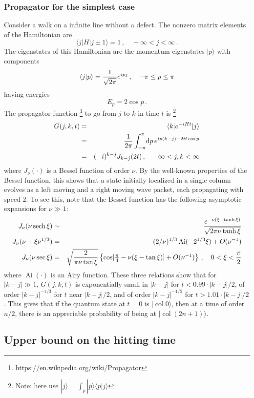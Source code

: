 \documentclass[aps,11pt,twoside,nofootinbib,tightenlines,superscriptaddress,preprintnumbers]{revtex4}
\newcommand{\<}{\langle}
\renewcommand{\>}{\rangle}
\newcommand{\be}{\begin{equation}}
\newcommand{\ee}{\end{equation}}
\newcommand{\bea}{\begin{eqnarray}}
\newcommand{\eea}{\end{eqnarray}}
\renewcommand{\d}{{\mathrm{d}}}
\newcommand{\sech}{\mathop{\mathrm{sech}}\nolimits}
\newcommand{\Ai}{\mathop{\mathrm{Ai}}\nolimits}
\newcommand{\col}{\mathop{\mathrm{col}}\nolimits}
\newenvironment{proof sketch}
{\trivlist\item\noindent{\bf Proof sketch}~}
{\qed\endtrivlist}
\begin{document}
\subsubsection{Propagator for the simplest case}

Consider a walk on a infinite line without a defect.
The nonzero matrix elements of the Hamiltonian are
\be
  \<j|H|j\pm 1\> = 1 \,,\quad -\infty < j < \infty
\,.
\ee
The eigenstates of this Hamiltonian are the momentum eigenstates $|p\>$ with components
\be
  \<j|p\> = {1 \over \sqrt{2\pi}} e^{i p j}
  \,, \quad -\pi \le p \le \pi
\ee
having energies
\be
  E_p = 2 \cos p 
\,.
\ee
The propagator function \footnote{https://en.wikipedia.org/wiki/Propagator} to go from $j$ to $k$ in time $t$ is \footnote{Note: here use $|j\> = \int_p |p\>\<p|j\>$}
\bea
\label{eq:green}
  G(j,k,t) &=& \<k|e^{-i H t}|j\> \\
           &=& {1 \over 2 \pi} \int_{-\pi}^\pi \! \d p \, 
	       e^{i p (k-j) - 2 i t \cos p} \\
	   &=& (-i)^{k-j} J_{k-j}(2t) \,,\quad -\infty < j,k < \infty
\eea
where $J_\nu(\cdot)$ is a Bessel function of order $\nu$.  By the
well-known properties of the Bessel function, this shows that a state
initially localized in a single column evolves as a left moving and a
right moving wave packet, each propagating with speed $2$.  To see this,
note that the Bessel function has the following asymptotic expansions for
$\nu \gg 1$:
\bea
  J_\nu(\nu \sech \xi) 
    &\sim& {e^{-\nu(\xi-\tanh \xi)} \over \sqrt{2 \pi \nu \tanh \xi}} 
    \label{eq:besselahead} \\
  J_\nu(\nu+\xi\nu^{1/3}) 
    &=& (2/\nu)^{1/3} \Ai(-2^{1/3}\xi) + O(\nu^{-1})
    \label{eq:besseledge} \\
  J_\nu(\nu \sec \xi)
       &=& \sqrt{2 \over \pi \nu \tan\xi} \left\{
           \cos[\textstyle{\pi \over 4}-\nu(\xi-\tan \xi)] + O(\nu^{-1})
	   \right\}
           \,, \quad 0 < \xi < {\pi \over 2} \label{eq:besselbehind}
\eea
where $\Ai(\cdot)$ is an Airy function.  These three relations
show that for $|k-j| \gg 1$, $G(j,k,t)$ is exponentially small in $|k-j|$
for $t <0.99\cdot |k-j|/2$, of order $|k-j|^{-1/3}$ for $t$ near $|k-j|/2$,
and of order $|k-j|^{-1/2}$ for $t >1.01\cdot |k-j|/2$. This gives that if the quantum state at $t=0$ is $|\col 0\>$, then at a time of order $n/2$, there is an appreciable probability of being at $|\col(2n+1)\>$.

\subsection{Upper bound on the hitting time}\label{subsec:hitting}
\end{document}

